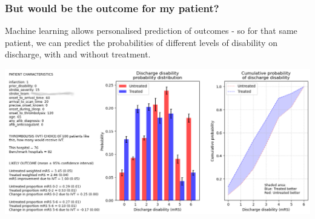 \begin{frame}
\frametitle{But would be the outcome for my patient?}

Machine learning allows personalised prediction of outcomes - so for that same patient, we can predict the probabilities of different levels of disability on discharge, with and without treatment.

\vspace{5mm}

\begin{center}
\includegraphics[width=1.0\textwidth]{./images_outcome/full_outcome_1}
\end{center}


\end{frame}
